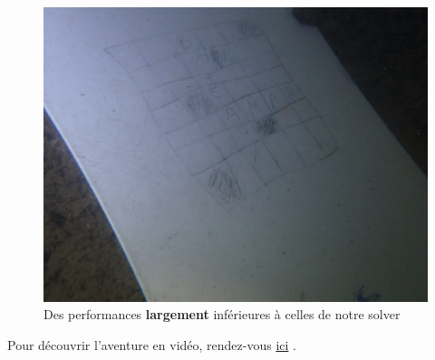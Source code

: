 \documentclass [ 11 pt ] {article}
\begin{document}
\begin{figure}[H] 
                \center 
                \includegraphics[width=0.9\linewidth]{Capture d’écran du 2022-04-21 20-20-41.png}
                \caption{Des performances \textbf{largement} inférieures à celles de notre solver}
\end{figure}

Pour découvrir l'aventure en vidéo, rendez-vous  \href{https://www.youtube.com/watch?v=NRIJIo-rFTw&feature=youtu.be}{ici} . 
\end{document}
